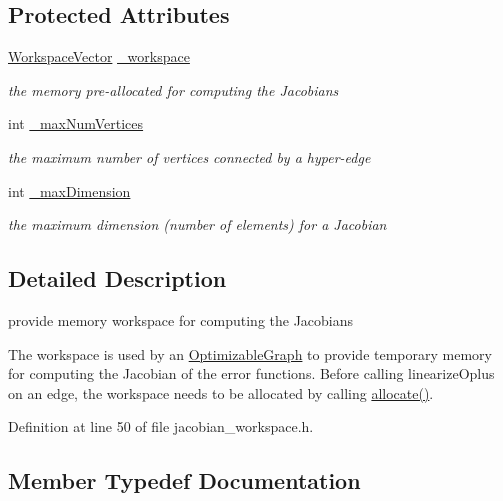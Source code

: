 \subsection*{Protected Attributes}
\begin{DoxyCompactItemize}
\item 
\hyperlink{classg2o_1_1JacobianWorkspace_aee9d767fa1208772a3de83732646e182}{Workspace\+Vector} \hyperlink{classg2o_1_1JacobianWorkspace_af7dbaa3a651808e1bf3f876896bd1bfc}{\+\_\+workspace}
\begin{DoxyCompactList}\small\item\em the memory pre-\/allocated for computing the Jacobians \end{DoxyCompactList}\item 
int \hyperlink{classg2o_1_1JacobianWorkspace_a640c84c19a739ce3116fc02c3a66b096}{\+\_\+max\+Num\+Vertices}
\begin{DoxyCompactList}\small\item\em the maximum number of vertices connected by a hyper-\/edge \end{DoxyCompactList}\item 
int \hyperlink{classg2o_1_1JacobianWorkspace_aa6cd4fb8bc1bb4fe9ada55d9feefc817}{\+\_\+max\+Dimension}
\begin{DoxyCompactList}\small\item\em the maximum dimension (number of elements) for a Jacobian \end{DoxyCompactList}\end{DoxyCompactItemize}


\subsection{Detailed Description}
provide memory workspace for computing the Jacobians 

The workspace is used by an \hyperlink{structg2o_1_1OptimizableGraph}{Optimizable\+Graph} to provide temporary memory for computing the Jacobian of the error functions. Before calling linearize\+Oplus on an edge, the workspace needs to be allocated by calling \hyperlink{classg2o_1_1JacobianWorkspace_a8e1d23ced91b721fdb5bd68c8c4e9fc3}{allocate()}. 

Definition at line 50 of file jacobian\+\_\+workspace.\+h.



\subsection{Member Typedef Documentation}
